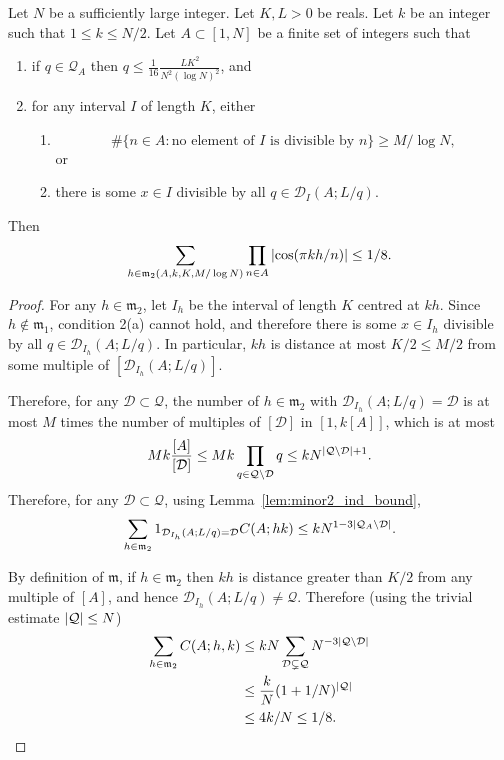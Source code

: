 \begin{lemma}\label{lem:minor2_bound}
Let $N$ be a sufficiently large integer. Let $K,L>0$ be reals. Let $k$ be an integer such that $1\leq k \leq N/2$.  Let $A\subset [1,N]$ be a finite set of integers such that
\begin{enumerate}
\item if $q\in\mathcal{Q}_A$ then $q\leq \tfrac{1}{16}\frac{LK^2}{N^2(\log N)^2}$,  and
\item for any interval $I$ of length $K$, either
\begin{enumerate}
\item \[\# \{ n\in A : \textrm{no element of }I\textrm{ is divisible by }n\}\geq M/\log N,\]
or
\item there is some $x\in I$ divisible by all $q\in\mathcal{D}_I(A;L/q)$.
\end{enumerate}
\end{enumerate}
Then
\[\sum_{h\in\mathfrak{m}_2(A,k,K,M/\log N)}\prod_{n\in A}\left\lvert \cos(\pi kh/n)\right\rvert\leq 1/8.\]
\end{lemma}
\begin{proof}
For any $h\in\mathfrak{m}_2$, let $I_h$ be the interval of length $K$ centred at $kh$. Since $h\not\in\mathfrak{m}_1$, condition 2(a) cannot hold, and therefore there is some $x\in I_h$ divisible by all $q\in\mathcal{D}_{I_h}(A;L/q)$. In particular, $kh$ is distance at most $K/2\leq M/2$ from some multiple of $[\mathcal{D}_{I_h}(A;L/q)]$.

Therefore, for any $\mathcal{D}\subset \mathcal{Q}$, the number of $h\in\mathfrak{m}_2$ with $\mathcal{D}_{I_h}(A;L/q)=\mathcal{D}$ is at most $M$ times the number of multiples of $[\mathcal{D}]$ in $[1,k[A]]$, which is at most
\[Mk\frac{[A]}{[\mathcal{D}]} \leq Mk\prod_{q\in\mathcal{Q}\backslash\mathcal{D}}q\leq kN^{\left\lvert \mathcal{Q}\backslash \mathcal{D}\right\rvert+1}.\]
Therefore, for any $\mathcal{D}\subset\mathcal{Q}$, using Lemma~\ref{lem:minor2_ind_bound},
\[\sum_{h\in \mathfrak{m}_2}1_{\mathcal{D}_{I_h}(A;L/q)=\mathcal{D}}C(A;hk)\leq kN^{1-3\left\lvert \mathcal{Q}_A\backslash\mathcal{D}\right\rvert}.\]


By definition of $\mathfrak{m}$, if $h\in\mathfrak{m}_2$ then $kh$ is distance greater than $K/2$ from any multiple of $[A]$, and hence $\mathcal{D}_{I_h}(A;L/q)\neq \mathcal{Q}$. Therefore (using the trivial estimate $\left\lvert \mathcal{Q}\right\rvert\leq N$)
\begin{align*}
\sum_{h\in\mathfrak{m}_2}C(A;h,k)
&\leq
kN\sum_{\mathcal{D}\subsetneq \mathcal{Q}}N^{-3\left\lvert \mathcal{Q}\backslash \mathcal{D}\right\rvert}\\
&\leq \frac{k}{N}(1+1/N)^{\left\lvert \mathcal{Q}\right\rvert}\\
&\leq 4k/N \leq 1/8.
\end{align*}
\end{proof}

